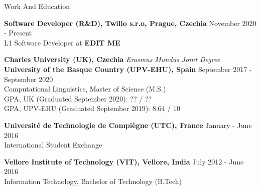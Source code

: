 \documentclass{resume} %
\begin{document}



    
\begin{rSection}{Work And Education}

    {\bf Software Developer (R\&D), Twilio s.r.o, Prague, Czechia} \hfill
        {November 2020 - Present}\\
            L1 Software Developer at \textbf{EDIT ME}
    
    {\bf Charles University (UK), Czechia} \hfill
        {\em Erasmus Mundus Joint Degree}\\
    {\bf University of the Basque Country (UPV-EHU), Spain} \hfill
        {September 2017 - September 2020}\\
            Computational Linguistics, Master of Science (M.S.)\\
            GPA, UK (Graduated September 2020): ?? / ??\\
            GPA, UPV-EHU (Graduated September 2019): 8.64 / 10
    
    {\bf Universit\'e de Technologie de Compi\`egne (UTC), France} \hfill
        {January - June 2016}\\
            International Student Exchange
    
    {\bf Vellore Institute of Technology (VIT), Vellore, India} \hfill
        {July 2012 - June 2016}\\
            Information Technology, Bachelor of Technology (B.Tech)

\end{rSection}
\end{document}
